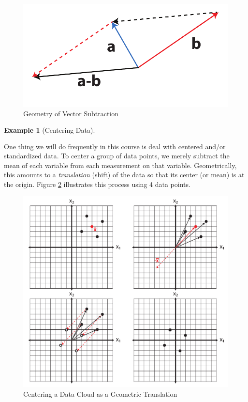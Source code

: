 \documentclass[
]{article}
\theoremstyle{definition}
\theoremstyle{definition}
\newtheorem{example}{Example}[section]
\theoremstyle{definition}
\theoremstyle{definition}
\theoremstyle{remark}
\begin{document}
\begin{figure}

{\centering \includegraphics[width=0.5\linewidth]{figs/vectorsub} 

}

\caption{Geometry of Vector Subtraction}\label{fig:vectorsub}
\end{figure}

\begin{example}[Centering Data]
\protect\hypertarget{exm:centering}{}\label{exm:centering}

One thing we will do frequently in this course is deal with centered and/or standardized data. To center a group of data points, we merely subtract the mean of each variable from each measurement on that variable. Geometrically, this amounts to a \emph{translation} (shift) of the data so that its center (or mean) is at the origin. Figure \ref{fig:centerall} illustrates this process using 4 data points.

\begin{figure}

{\centering \includegraphics[width=0.8\linewidth]{figs/centerall} 

}

\caption{Centering a Data Cloud as a Geometric Translation}\label{fig:centerall}
\end{figure}

\end{example}
\end{document}
